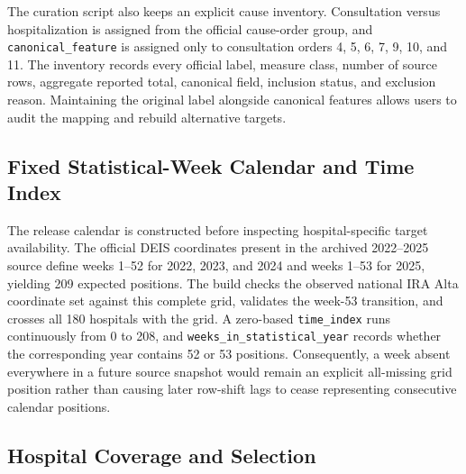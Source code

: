 \documentclass[data,datadescriptor,submit,moreauthors,pdftex]{Definitions/mdpi}
\begin{document}
The curation script also keeps an explicit cause inventory. Consultation versus hospitalization is assigned from the official cause-order group, and \texttt{canonical\_feature} is assigned only to consultation orders 4, 5, 6, 7, 9, 10, and 11. The inventory records every official label, measure class, number of source rows, aggregate reported total, canonical field, inclusion status, and exclusion reason. Maintaining the original label alongside canonical features allows users to audit the mapping and rebuild alternative targets.

\subsection{Fixed Statistical-Week Calendar and Time Index}

The release calendar is constructed before inspecting hospital-specific target availability. The official DEIS coordinates present in the archived 2022--2025 source define weeks 1--52 for 2022, 2023, and 2024 and weeks 1--53 for 2025, yielding 209 expected positions. The build checks the observed national IRA Alta coordinate set against this complete grid, validates the week-53 transition, and crosses all 180 hospitals with the grid. A zero-based \texttt{time\_index} runs continuously from 0 to 208, and \texttt{weeks\_in\_statistical\_year} records whether the corresponding year contains 52 or 53 positions. Consequently, a week absent everywhere in a future source snapshot would remain an explicit all-missing grid position rather than causing later row-shift lags to cease representing consecutive calendar positions.

\subsection{Hospital Coverage and Selection}
\end{document}

